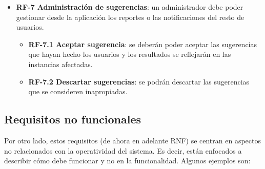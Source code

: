 \begin{itemize}
	\item \textbf{RF-7 Administración de sugerencias}: un administrador debe poder gestionar desde la aplicación los reportes o las notificaciones del resto de usuarios.
\begin{itemize}
	\item \textbf{RF-7.1 Aceptar sugerencia}: se deberán poder aceptar las sugerencias que hayan hecho los usuarios y los resultados se reflejarán en las instancias afectadas.
	
	\item \textbf{RF-7.2 Descartar sugerencias}: se podrán descartar las sugerencias que se consideren inapropiadas.
\end{itemize}

\end{itemize}

\subsection{Requisitos no funcionales}
\label{s:requisitos-no-funcionales}

Por otro lado, estos requisitos (de ahora en adelante RNF) se centran en aspectos no relacionados con la operatividad del sistema. Es decir, están enfocados a describir cómo debe funcionar y no en la funcionalidad. Algunos ejemplos son:


